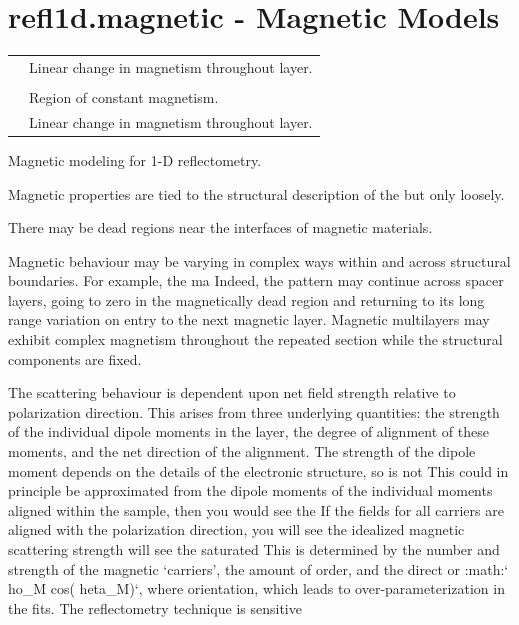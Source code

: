 \documentclass[letterpaper,10pt,english]{sphinxmanual}
\begin{document}
\section{refl1d.magnetic - Magnetic Models}
\label{api/magnetic:refl1d-magnetic-magnetic-models}\label{api/magnetic::doc}
\begin{tabulary}{\linewidth}{LL}
\hline

{\hyperref[api/magnetic:refl1d.magnetic.FreeMagnetic]{}}
 & 
Linear change in magnetism throughout layer.
\\

{\hyperref[api/magnetic:refl1d.magnetic.MagneticLayer]{}}
 & 

\\

{\hyperref[api/magnetic:refl1d.magnetic.MagneticSlab]{}}
 & 
Region of constant magnetism.
\\

{\hyperref[api/magnetic:refl1d.magnetic.MagneticTwist]{}}
 & 
Linear change in magnetism throughout layer.
\\
\hline
\end{tabulary}

\label{api/magnetic:module-refl1d.magnetic}
Magnetic modeling for 1-D reflectometry.

Magnetic properties are tied to the structural description of the
but only loosely.

There may be dead regions near the interfaces of magnetic materials.

Magnetic behaviour may be varying in complex ways within and
across structural boundaries.  For example, the ma
Indeed, the pattern may continue
across spacer layers, going to zero in the magnetically dead
region and returning to its long range variation on entry to
the next magnetic layer.  Magnetic multilayers may exhibit complex
magnetism throughout the repeated section while the structural
components are fixed.

The scattering behaviour is dependent upon net field strength relative to
polarization direction.   This arises from three underlying quantities:
the strength of the individual dipole moments in the layer, the degree
of alignment of these moments, and the net direction of the alignment.  The
strength of the dipole moment depends on the details of the electronic
structure, so is not This could in principle be approximated from
the dipole moments of the individual moments
aligned within the sample, then you would see the
If the fields for all carriers are aligned with
the polarization direction, you will see the idealized magnetic scattering
strength
will see the saturated This is determined by the number and strength
of the magnetic `carriers', the amount of order, and the direct or :math:{}`
ho\_M cos(      heta\_M){}`, where
orientation, which leads to over-parameterization in the fits.  The
reflectometry technique is sensitive
\end{document}
